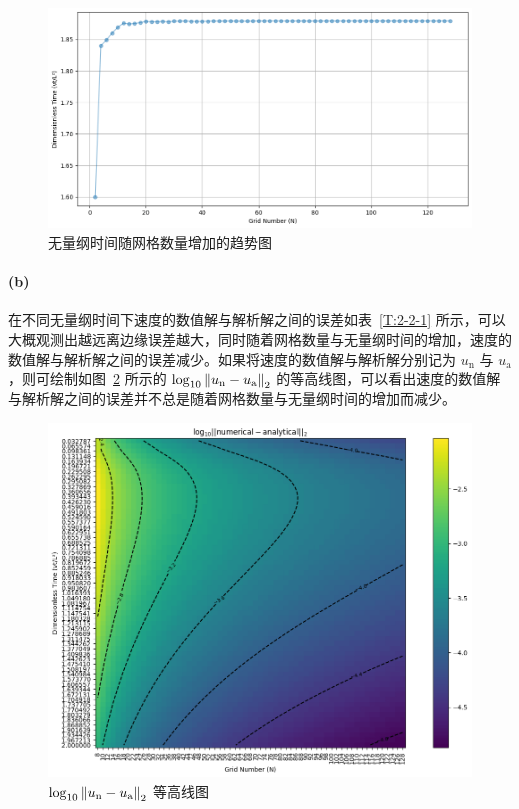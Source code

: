 \begin{figure}[H]
    \centering
    \includegraphics[width=.75\textwidth]{figure/2/dimensionless_time.png}
    \caption{无量纲时间随网格数量增加的趋势图}\label{F:2-2-3}
\end{figure}

\paragraph{(b)}
在不同无量纲时间下速度的数值解与解析解之间的误差如表~\ref{T:2-2-1} 所示，可以大概观测出越远离边缘误差越大，同时随着网格数量与无量纲时间的增加，速度的数值解与解析解之间的误差减少。如果将速度的数值解与解析解分别记为 $u_{\mathrm{n}}$ 与 $u_{\mathrm{a}}$，则可绘制如图~\ref{F:2-2-2} 所示的 $\log_{10}\norm{u_{\mathrm{n}}-u_{\mathrm{a}}}_2$ 的等高线图，可以看出速度的数值解与解析解之间的误差并不总是随着网格数量与无量纲时间的增加而减少。

\begin{figure}[H]
    \centering
    \includegraphics[width=.8\textwidth]{figure/2/error.png}
    \caption{$\log_{10}\norm{u_{\mathrm{n}}-u_{\mathrm{a}}}_2$ 等高线图}\label{F:2-2-2}
\end{figure}

